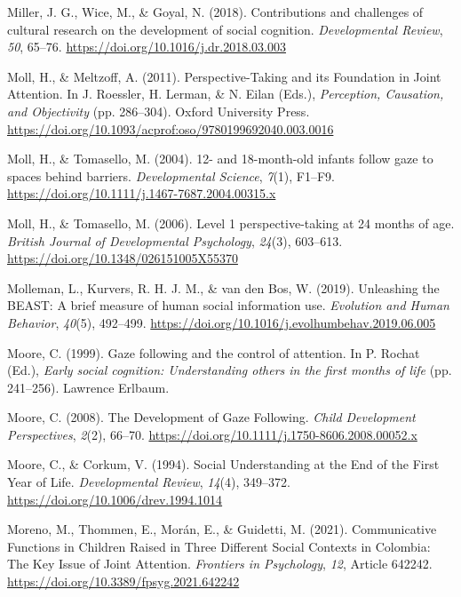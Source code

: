 \documentclass[
]{scrbook}
\newlength{\cslhangindent}
\newenvironment{CSLReferences}[2] %
 {\begin{list}{}{%
  \setlength{\itemindent}{0pt}
  \setlength{\leftmargin}{0pt}
  \setlength{\parsep}{0pt}
  \ifodd #1
   \setlength{\leftmargin}{\cslhangindent}
   \setlength{\itemindent}{-1\cslhangindent}
  \fi
  \setlength{\itemsep}{#2\baselineskip}}}
 {\end{list}}
\begin{document}
\begin{CSLReferences}{1}{0}
Miller, J. G., Wice, M., \& Goyal, N. (2018). Contributions and challenges of cultural research on the development of social cognition. \emph{Developmental Review}, \emph{50}, 65--76. \url{https://doi.org/10.1016/j.dr.2018.03.003}

Moll, H., \& Meltzoff, A. (2011). Perspective-{Taking} and its {Foundation} in {Joint Attention}. In J. Roessler, H. Lerman, \& N. Eilan (Eds.), \emph{Perception, {Causation}, and {Objectivity}} (pp. 286--304). Oxford University Press. \url{https://doi.org/10.1093/acprof:oso/9780199692040.003.0016}

Moll, H., \& Tomasello, M. (2004). 12- and 18-month-old infants follow gaze to spaces behind barriers. \emph{Developmental Science}, \emph{7}(1), F1--F9. \url{https://doi.org/10.1111/j.1467-7687.2004.00315.x}

Moll, H., \& Tomasello, M. (2006). Level 1 perspective-taking at 24 months of age. \emph{British Journal of Developmental Psychology}, \emph{24}(3), 603--613. \url{https://doi.org/10.1348/026151005X55370}

Molleman, L., Kurvers, R. H. J. M., \& van den Bos, W. (2019). Unleashing the {BEAST}: A brief measure of human social information use. \emph{Evolution and Human Behavior}, \emph{40}(5), 492--499. \url{https://doi.org/10.1016/j.evolhumbehav.2019.06.005}

Moore, C. (1999). Gaze following and the control of attention. In P. Rochat (Ed.), \emph{Early social cognition: {Understanding} others in the first months of life} (pp. 241--256). Lawrence Erlbaum.

Moore, C. (2008). The {Development} of {Gaze Following}. \emph{Child Development Perspectives}, \emph{2}(2), 66--70. \url{https://doi.org/10.1111/j.1750-8606.2008.00052.x}

Moore, C., \& Corkum, V. (1994). Social {Understanding} at the {End} of the {First Year} of {Life}. \emph{Developmental Review}, \emph{14}(4), 349--372. \url{https://doi.org/10.1006/drev.1994.1014}

Moreno, M., Thommen, E., Morán, E., \& Guidetti, M. (2021). Communicative {Functions} in {Children Raised} in {Three Different Social Contexts} in {Colombia}: {The Key Issue} of {Joint Attention}. \emph{Frontiers in Psychology}, \emph{12}, Article 642242. \url{https://doi.org/10.3389/fpsyg.2021.642242}


\end{CSLReferences}
\end{document}
